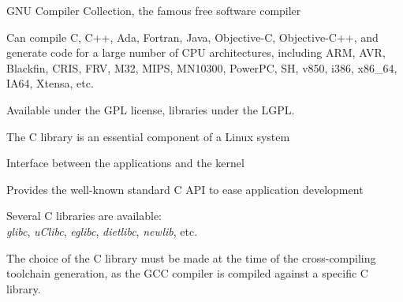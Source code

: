     \startitemize
    \item GNU Compiler Collection, the famous free software compiler
    \item Can compile C, C++, Ada, Fortran, Java, Objective-C,
      Objective-C++, and generate code for a large number of CPU
      architectures, including ARM, AVR, Blackfin, CRIS, FRV, M32, MIPS,
      MN10300, PowerPC, SH, v850, i386, x86\_64, IA64, Xtensa, etc.
    \item {}
    \item Available under the GPL license, libraries under the LGPL.
    \stopitemize

    \startitemize
    \item The C library is an essential component of a Linux system
      \startitemize
      \item Interface between the applications and the kernel
      \item Provides the well-known standard C API to ease application
        development
      \stopitemize
    \item Several C libraries are available:\\
      {\em glibc}, {\em uClibc}, {\em eglibc}, {\em dietlibc}, {\em
        newlib}, etc.
    \item The choice of the C library must be made at the time of the
      cross-compiling toolchain generation, as the GCC compiler is
      compiled against a specific C library.
    \stopitemize
